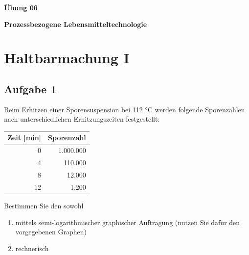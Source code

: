 \documentclass[a4paper,11pt]{article}
\begin{document}


\bckgrnd


\begin{center}
\LARGE
\color{white}
\textbf{Übung 06} \par \vspace*{2mm}
\large \color{miugray} \textbf{Prozessbezogene Lebensmitteltechnologie}
\end{center}
\par 
\vspace*{6mm}


\color{miudiutex}

\section*{Haltbarmachung I}

\subsection*{Aufgabe 1} Beim Erhitzen einer Sporensuspension bei 112 °C werden folgende Sporenzahlen nach unterschiedlichen Erhitzungszeiten festgestellt:


\pp
\begin{center}\begin{tabular}{r|r}
\rowcolor{miugray}
Zeit [min] & Sporenzahl \\ \hline
0 &1.000.000 \\
4 &110.000 \\
8 &12.000 \\
12 &1.200 \\
\end{tabular}\end{center}


\ppbig
{}

Bestimmen Sie den  sowohl 
\begin{enumerate}[label=\alph*)]
\item mittels semi-logarithmischer graphischer Auftragung (nutzen Sie dafür den vorgegebenen Graphen) 
\item rechnerisch
\end{enumerate}
\end{document}
